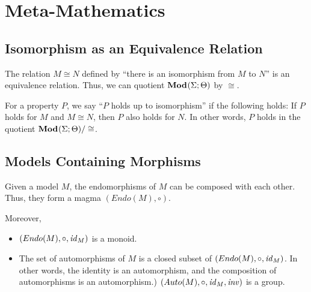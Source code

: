 %


\section{Meta-Mathematics}\label{sec:univ:meta}

\subsection{Isomorphism as an Equivalence Relation}

The relation $M\cong N$ defined by ``there is an isomorphism from $M$ to $N$'' is an equivalence relation.
Thus, we can quotient ${\mathbf{Mod}^{}}(\Sigma;\Theta)$ by $\cong$.

For a property $P$, we say ``$P$ holds up to isomorphism'' if the following holds: If $P$ holds for $M$ and $M\cong N$, then $P$ also holds for $N$.
In other words, $P$ holds in the quotient ${\mathbf{Mod}^{}}(\Sigma;\Theta)/\cong$.

\subsection{Models Containing Morphisms}

Given a model $M$, the endomorphisms of $M$ can be composed with each other.
Thus, they form a magma $(Endo(M),\circ)$.

Moreover,
\begin{itemize}
\item $(Endo(M),\circ, \mathit{id}_{M})$ is a monoid.
\item The set of automorphisms of $M$ is a closed subset of $(Endo(M),\circ, \mathit{id}_{M})$.
In other words, the identity is an automorphism, and the composition of automorphisms is an automorphism.)
$(Auto(M),\circ, \mathit{id}_{M},\mathit{inv})$ is a group.
\end{itemize}

